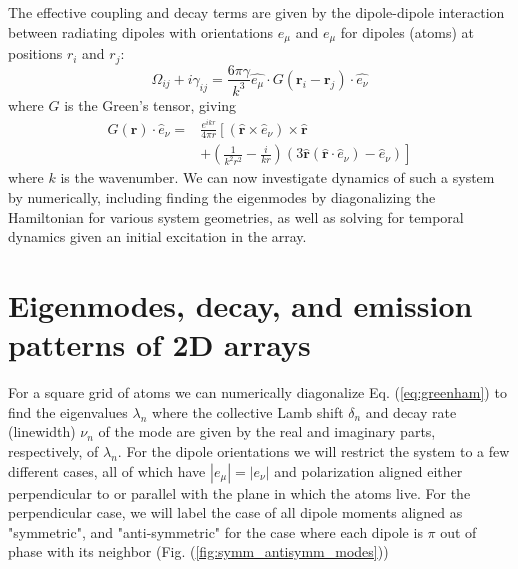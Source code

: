 The effective coupling and decay terms are given by the dipole-dipole interaction between radiating dipoles with orientations $e_{\mu}$ and $e_{\mu}$ for dipoles (atoms) at positions $r_i$ and $r_j$: 
\begin{equation}
    \Omega_{ij} + i \gamma_{ij} = \frac{6\pi \gamma}{k^3}\hat{e_{\mu}}\cdot G(\mathbf{r}_i - \mathbf{r}_j) \cdot \hat{e_{\nu}}
\end{equation}
where $G$ is the Green's tensor, giving
\begin{equation}
    \begin{aligned}
        G\left(\mathbf{r}\right) \cdot \hat{e}_{\nu}= & \frac{e^{i k r}}{4 \pi r}\left[(\hat{\mathbf{r}} \times \hat{e}_{\nu}) \times \hat{\mathbf{r}} \right. \\
        & \left.+\left(\frac{1}{k^2 r^2}-\frac{i}{k r}\right)\left(3 \hat{\mathbf{r}}(\hat{\mathbf{r}} \cdot \hat{e}_{\nu})-\hat{e}_{\nu}\right)\right]
    \end{aligned}
\end{equation}
where $k$ is the wavenumber. We can now investigate dynamics of such a system by numerically, including finding the eigenmodes by diagonalizing the Hamiltonian for various system geometries, as well as solving for temporal dynamics given an initial excitation in the array.

\section{Eigenmodes, decay, and emission patterns of 2D arrays}
For a square grid of atoms we can numerically diagonalize Eq. (\ref{eq:greenham}) to find the eigenvalues $\lambda_n$ where the collective Lamb shift $\delta_n$ and decay rate (linewidth) $\nu_n$ of the mode are given by the real and imaginary parts, respectively, of $\lambda_n$. For the dipole orientations we will restrict the system to a few different cases, all of which have $|e_{\mu}| = |e_{\nu}|$ and polarization aligned either perpendicular to or parallel with the plane in which the atoms live. For the perpendicular case, we will label the case of all dipole moments aligned as "symmetric", and "anti-symmetric" for the case where each dipole is $\pi$ out of phase with its neighbor (Fig. (\ref{fig:symm_antisymm_modes}))

